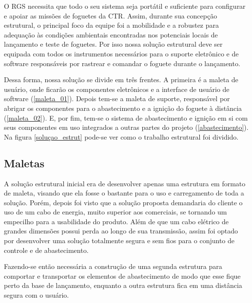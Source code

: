 \par O RGS necessita que todo o seu sistema seja portátil e suficiente para configurar e apoiar as missões de foguetes da CTR. Assim, durante sua concepção estrutural, o principal foco da equipe foi a mobilidade e a robustez para adequação às condições ambientais encontradas nos potenciais locais de lançamento e teste de foguetes. Por isso nossa solução estrutural deve ser equipada com todos os instrumentos necessários para o suporte eletrônico e de software responsáveis por rastrear e comandar o foguete durante o lançamento.

\par Dessa forma, nossa solução se divide em três frentes. A primeira é a maleta de usuário, onde ficarão os componentes eletrônicos e a interface de usuário de software (\ref{maleta_01}). Depois tem-se a maleta de suporte, responsável por abrigar os componentes para o abastecimento e a ignição do foguete à distância (\ref{maleta_02}). E, por fim, tem-se o sistema de abastecimento e ignição em si com seus componentes em uso integrados a outras partes do projeto (\ref{abastecimento}). Na figura \ref{soluçao_estrut} pode-se ver como o trabalho estrutural foi dividido.


\subsection{Maletas}

\par A solução estrutural inicial era de desenvolver apenas uma estrutura em formato de maleta, visando que ela fosse o bastante para o uso e carregamento de toda a solução. Porém, depois foi visto que a solução proposta demandaria do cliente o uso de um cabo de energia, muito superior aos comerciais, se tornando um empecilho para a usabilidade do produto. Além de que um cabo elétrico de grandes dimensões possui perda ao longo de sua transmissão, assim foi optado por desenvolver uma solução totalmente segura e sem fios para o conjunto de controle e de abastecimento. 

\par Fazendo-se então necessária a construção de uma segunda estrutura para comportar e transportar os elementos de abastecimento de modo que esse fique perto da base de lançamento, enquanto a outra estrutura fica em uma distância segura com o usuário.

